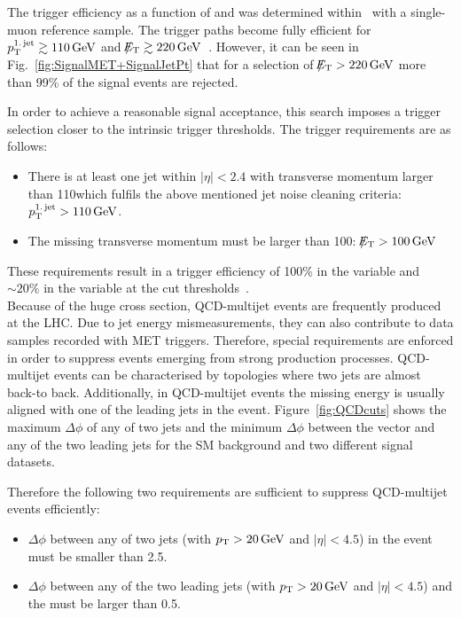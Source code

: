 The trigger efficiency as a function of \met and \ptfirstjet was determined within~\cite{bib:CMS:DM_8TeV} with a single-muon reference sample.
The trigger paths become fully efficient for \mbox{$p_{\text{T}}^{\text{1.\,jet}} \gtrsim 110\,\text{Ge}\kern-0.06667em\text{V}$} and \mbox{$\slash\mkern-12mu{E}_{\text{T}} \gtrsim 220\,\text{Ge}\kern-0.06667em\text{V}$~\cite{bib:CMS:DM_8TeV_AN}}.
However, it can be seen in Fig.~\ref{fig:SignalMET+SignalJetPt} that for a selection of \mbox{$\slash\mkern-12mu{E}_{\text{T}}>220\,\text{Ge}\kern-0.06667em\text{V}$} more than 99\% of the signal events are rejected.

In order to achieve a reasonable signal acceptance, this search imposes a trigger selection closer to the intrinsic trigger thresholds.
The trigger requirements are as follows:
\begin{itemize}
\renewcommand{\labelitemi}{\footnotesize{\ding{118}}}
\item There is at least one jet within $|\eta|<2.4$ with transverse momentum larger than 110\gev which fulfils the above mentioned jet noise cleaning criteria: \mbox{$p_{\text{T}}^{\text{1.\,jet}}>110\,\text{Ge}\kern-0.06667em\text{V}$}.
\item The missing transverse momentum must be larger than 100\gev: \mbox{$\slash\mkern-12mu{E}_{\text{T}}>100\,\text{Ge}\kern-0.06667em\text{V}$}
\end{itemize}
These requirements result in a trigger efficiency of 100\% in the variable \ptfirstjet and $\sim20\%$ in the variable \met at the cut thresholds~\cite{bib:CMS:DM_8TeV_AN}.\\

Because of the huge cross section, QCD-multijet events are frequently produced at the LHC.
Due to jet energy mismeasurements, they can also contribute to data samples recorded with MET triggers.
Therefore, special requirements are enforced in order to suppress events emerging from strong production processes.
QCD-multijet events can be characterised by topologies where two jets are almost back-to back.
Additionally, in QCD-multijet events the missing energy is usually aligned with one of the leading jets in the event.
Figure~\ref{fig:QCDcuts} shows the maximum $\Delta\phi$ of any of two jets and the minimum $\Delta\phi$ between the \met vector and any of the two leading jets for the SM background and two different signal datasets.

Therefore the following two requirements are sufficient to suppress QCD-multijet events efficiently:
\begin{itemize}
\renewcommand{\labelitemi}{\footnotesize{\ding{118}}}
\item $\Delta\phi$ between any of two jets (with $p_{\text{T}}>20\,\text{Ge}\kern-0.06667em\text{V}$ and $|\eta|<4.5$) in the event must be smaller than 2.5. %
\item $\Delta\phi$ between any of the two leading jets (with $p_{\text{T}}>20\,\text{Ge}\kern-0.06667em\text{V}$ and $|\eta|<4.5$) and the \met must be larger than 0.5. %
\end{itemize}

